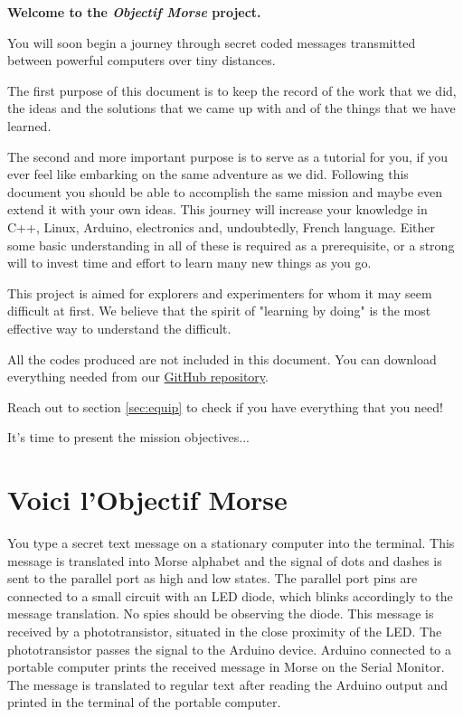 \documentclass[12pt]{report}
\begin{document}
\textbf{Welcome to the \textit{Objectif Morse} project.}

You will soon begin a journey through secret coded messages transmitted between powerful computers over tiny distances.

The first purpose of this document is to keep the record of the work that we did, the ideas and the solutions that we came up with and of the things that we have learned.

The second and more important purpose is to serve as a tutorial for you, if you ever feel like embarking on the same adventure as we did. Following this document you should be able to accomplish the same mission and maybe even extend it with your own ideas. This journey will increase your knowledge in C++, Linux, Arduino, electronics and, undoubtedly, French language. Either some basic understanding in all of these is required as a prerequisite, or a strong will to invest time and effort to learn many new things as you go.

This project is aimed for explorers and experimenters for whom it may seem difficult at first. We believe that the spirit of "learning by doing" is the most effective way to understand the difficult.

All the codes produced are not included in this document. You can download everything needed from our \href{https://github.com/camillejr/objectif_morse}{GitHub repository}.

Reach out to section \ref{sec:equip} to check if you have everything that you need!

It's time to present the mission objectives...

\section{Voici l'Objectif Morse}

You type a secret text message on a stationary computer into the terminal. This message is translated into Morse alphabet and the signal of dots and dashes is sent to the parallel port as high and low states. The parallel port pins are connected to a small circuit with an LED diode, which blinks accordingly to the message translation. No spies should be observing the diode. This message is received by a phototransistor, situated in the close proximity of the LED. The phototransistor passes the signal to the Arduino device. Arduino connected to a portable computer prints the received message in Morse on the Serial Monitor. The message is translated to regular text after reading the Arduino output and printed in the terminal of the portable computer. 
\end{document}
